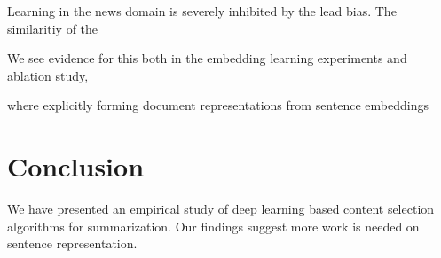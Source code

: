 \documentclass[11pt,a4paper]{article}
\begin{document}
Learning in the news domain is severely inhibited by the lead bias. 
The similaritiy of the 


We see evidence for this both in the embedding learning experiments and
ablation study,





where explicitly forming document representations
from sentence embeddings





\section{Conclusion}
We have presented an empirical study of deep learning based content selection
algorithms for summarization. Our findings suggest more work is needed 
on sentence representation.






\end{document}
